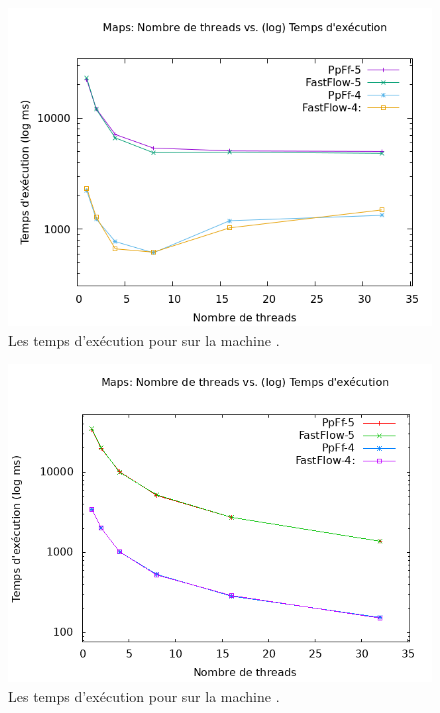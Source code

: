 \begin{figure}[H]
\centering
     \includegraphics[width=1.0\textwidth]{Figures/graphe_temps_Java_Maps.png}
      \caption{Les temps d'ex\'ecution pour  sur la machine .}
       \label{GrapheTempsMapsJava.fig}
\end{figure}

\begin{figure}[H]
\centering
     \includegraphics[width=1.0\textwidth]{Figures/graphe_temps_Japet_Maps.png}
      \caption{Les temps d'ex\'ecution pour  sur la machine .}
       \label{GrapheTempsMapstJapet.fig}
\end{figure}


